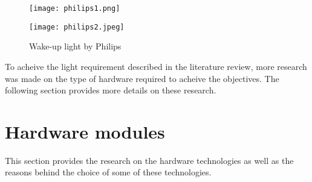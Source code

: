 \begin{figure}[h!]
\centering
\begin{minipage}[b]{0.45\textwidth}
\texttt{[image: philips1.png]}
\label{fig:philips1}
\end{minipage}
\begin{minipage}[b]{0.45\textwidth}
\texttt{[image: philips2.jpeg]}
\label{fig:philips2}
\end{minipage}
\caption{Wake-up light by Philips}
\label{philips}
\end{figure}

\vfill
To acheive the light requirement described in the literature review, more research was made on the type of hardware required to acheive the objectives. The following section provides more details on these research. 

\section{Hardware modules}
This section provides the research on the hardware technologies as well as the reasons behind the choice of some of these technologies. 

